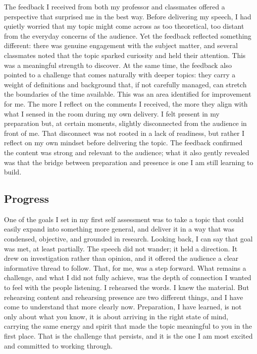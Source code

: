 \documentclass[12pt]{article}
\begin{document}
The feedback I received from both my professor and classmates offered a perspective that surprised me in the best way. Before delivering my speech, I had quietly worried that my topic might come across as too theoretical, too distant from the everyday concerns of the audience. Yet the feedback reflected something different: there was genuine engagement with the subject matter, and several classmates noted that the topic sparked curiosity and held their attention. This was a meaningful strength to discover. At the same time, the feedback also pointed to a challenge that comes naturally with deeper topics: they carry a weight of definitions and background that, if not carefully managed, can stretch the boundaries of the time available. This was an area identified for improvement for me. The more I reflect on the comments I received, the more they align with what I sensed in the room during my own delivery. I felt present in my preparation but, at certain moments, slightly disconnected from the audience in front of me. That disconnect was not rooted in a lack of readiness, but rather I reflect on my own mindset before delivering the topic. The feedback confirmed the content was strong and relevant to the audience; what it also gently revealed was that the bridge between preparation and presence is one I am still learning to build.

\subsection*{Progress}
One of the goals I set in my first self assessment was to take a topic that could easily expand into something more general, and deliver it in a way that was condensed, objective, and grounded in research. Looking back, I can say that goal was met, at least partially. The speech did not wander; it held a direction. It drew on investigation rather than opinion, and it offered the audience a clear informative thread to follow. That, for me, was a step forward. What remains a challenge, and what I did not fully achieve, was the depth of connection I wanted to feel with the people listening. I rehearsed the words. I knew the material. But rehearsing content and rehearsing presence are two different things, and I have come to understand that more clearly now. Preparation, I have learned, is not only about what you know, it is about arriving in the right state of mind, carrying the same energy and spirit that made the topic meaningful to you in the first place. That is the challenge that persists, and it is the one I am most excited and committed to working through.
\end{document}
